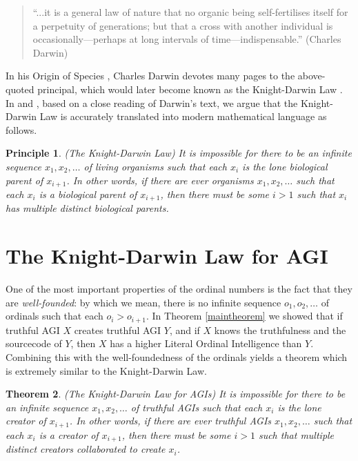 \documentclass[runningheads]{llncs}
\newtheorem{mytheorem}{Theorem}
\newtheorem{myprinciple}[mytheorem]{Principle}
\begin{document}
\begin{quote}
``...it is a general law of nature that no organic being self-fertilises itself
for a perpetuity of generations; but that a cross with another individual
is occasionally---perhaps at long intervals of time---indispensable.''
(Charles Darwin)
\end{quote}

In his Origin of Species \cite{originofspecies}, Charles Darwin devotes many
pages to the above-quoted principal, which would later become known as the
Knight-Darwin Law \cite{darwin1898knight}. In \cite{alexander2013} and
\cite{alexander2015alternative}, based on a close reading of Darwin's text, we argue
that the Knight-Darwin Law is accurately translated into modern mathematical
language as follows.

\begin{myprinciple}
(The Knight-Darwin Law)
It is impossible for there to be an infinite sequence
$x_1,x_2,\ldots$ of living organisms such that each $x_i$
is the lone biological parent of $x_{i+1}$. In other words,
if there are ever organisms $x_1,x_2,\ldots$ such that each
$x_i$ is a biological parent of $x_{i+1}$, then there must
be some $i>1$ such that $x_i$ has multiple distinct biological
parents.
\end{myprinciple}


\section{The Knight-Darwin Law for AGI}
\label{knightdarwinagisection}

One of the most important properties of the ordinal numbers is the
fact that they are \emph{well-founded}: by which we mean, there is
no infinite sequence $o_1,o_2,\ldots$ of ordinals such that each
$o_i>o_{i+1}$. In Theorem \ref{maintheorem} we showed that if truthful
AGI $X$ creates truthful AGI $Y$, and if $X$ knows the truthfulness
and the sourcecode of $Y$, then $X$ has a higher Literal Ordinal Intelligence
than $Y$. Combining this with the well-foundedness of the ordinals yields
a theorem which is extremely similar to the Knight-Darwin Law.

\begin{mytheorem}
\label{maintheorem2}
(The Knight-Darwin Law for AGIs)
It is impossible for there to be an infinite sequence
$x_1,x_2,\ldots$ of truthful AGIs such that each $x_i$ is the lone creator of $x_{i+1}$.
In other words, if there are
ever truthful AGIs $x_1,x_2,\ldots$ such that each $x_i$ is a creator of $x_{i+1}$,
then there must be some $i>1$ such that multiple distinct creators collaborated to
create $x_i$.
\end{mytheorem}
\end{document}
